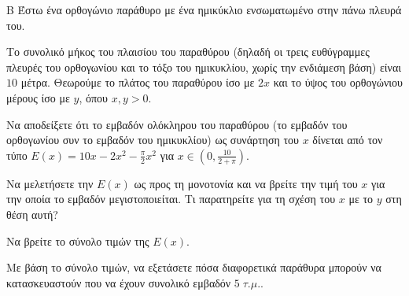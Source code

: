 \begin{thema}{Β}
Έστω ένα ορθογώνιο παράθυρο με ένα ημικύκλιο ενσωματωμένο στην πάνω πλευρά του.
\begin{center}
\end{center}
Το συνολικό μήκος του πλαισίου του παραθύρου (δηλαδή οι τρεις ευθύγραμμες πλευρές του ορθογωνίου και το τόξο του ημικυκλίου, χωρίς την ενδιάμεση βάση) είναι $10$ μέτρα. Θεωρούμε το πλάτος του παραθύρου ίσο με $2x$ και το ύψος του ορθογώνιου μέρους ίσο με $y$, όπου $x, y > 0$.
\begin{erwthma}
  \item Να αποδείξετε ότι το εμβαδόν ολόκληρου του παραθύρου (το εμβαδόν του ορθογωνίου συν το εμβαδόν του ημικυκλίου) ως συνάρτηση του $x$ δίνεται από τον τύπο $E(x) = 10x - 2x^2 - \frac{\pi}{2}x^2$ για $x \in \left(0, \frac{10}{2+\pi}\right)$.
  \item Να μελετήσετε την $E(x)$ ως προς τη μονοτονία και να βρείτε την τιμή του $x$ για την οποία το εμβαδόν μεγιστοποιείται. Τι παρατηρείτε για τη σχέση του $x$ με το $y$ στη θέση αυτή?
  \item Να βρείτε το σύνολο τιμών της $E(x)$.
  \item Με βάση το σύνολο τιμών, να εξετάσετε πόσα διαφορετικά παράθυρα μπορούν να κατασκευαστούν που να έχουν συνολικό εμβαδόν $5 \; \tau.\mu.$.
\end{erwthma}
\end{thema}
